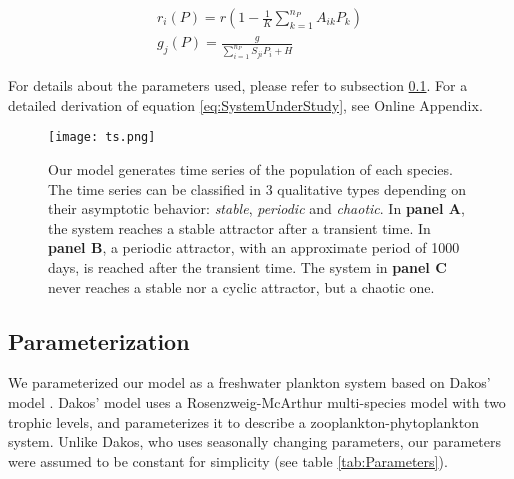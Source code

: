 \begin{eqnarray}
\label{eq:HollingGenerator}
	r_i(P) = r \left( 1 - \frac{1}{K} \sum_{k=1}^{n_P} A_{ik} P_k \right)
	\\
	g_j(P) = \frac{g}{\sum_{i=1}^{n_P} S_{ji} P_i + H}
\end{eqnarray}

For details about the parameters used, please refer to subsection \ref{subsec:Parameterization}. For a detailed derivation of equation \ref{eq:SystemUnderStudy}, see Online Appendix.

\begin{figure}
	\begin{center}
		\texttt{[image: ts.png]}
	\end{center}
	\caption{Our model generates time series of the population of each species. The time series can be classified in $3$ qualitative types depending on their asymptotic behavior: \textit{stable}, \textit{periodic} and \textit{chaotic}. In \textbf{panel A}, the system reaches a stable attractor after a transient time. In \textbf{panel B}, a periodic attractor, with an approximate period of 1000 days, is reached after the transient time. The system in \textbf{panel C} never reaches a stable nor a cyclic attractor, but a chaotic one.}
	\label{fig:TimeSeries}
\end{figure}

\subsection{Parameterization}
\label{subsec:Parameterization}
We parameterized our model as a freshwater plankton system based on Dakos' model \cite{Dakos2009b}. Dakos' model uses a Rosenzweig-McArthur multi-species model with two trophic levels, and parameterizes it to describe a zooplankton-phytoplankton system. Unlike Dakos, who uses seasonally changing parameters, our parameters were assumed to be constant for simplicity (see table \ref{tab:Parameters}).

